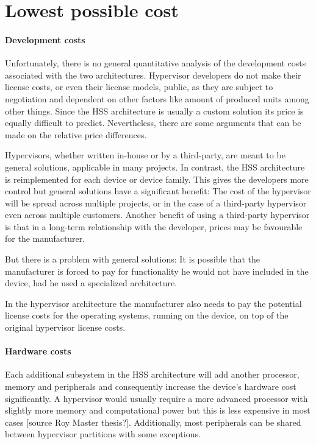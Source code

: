 
\section{Lowest possible cost}
\paragraph{Development costs}
Unfortunately, there is no general quantitative analysis of the development costs associated with the two architectures. Hypervisor developers do not make their license costs, or even their license models, public, as they are subject to negotiation and dependent on other factors like amount of produced units among other things. Since the \gls{HSS} architecture is usually a custom solution its price is equally difficult to predict. Nevertheless, there are some arguments that can be made on the relative price differences. 

Hypervisors, whether written in-house or by a third-party, are meant to be general solutions, applicable in many projects. In contrast, the \gls{HSS} architecture is reimplemented for each device or device family. This gives the developers more control but general solutions have a significant benefit: The cost of the hypervisor will be spread across multiple projects, or in the case of a third-party hypervisor even across multiple customers. Another benefit of using a third-party hypervisor is that in a long-term relationship with the developer, prices may be favourable for the manufacturer.

But there is a problem with general solutions: It is possible that the manufacturer is forced to pay for functionality he would not have included in the device, had he used a specialized architecture. 

In the hypervisor architecture the manufacturer also needs to pay the potential license costs for the operating systems, running on the device, on top of the original hypervisor license costs.

\paragraph{Hardware costs}
Each additional subsystem in the \gls{HSS} architecture will add another processor, memory and peripherals and consequently increase the device's hardware cost significantly. A hypervisor would usually require a more advanced processor with slightly more memory and computational power but this is less expensive in most cases [source Roy Master thesis?]. Additionally, most peripherals can be shared between hypervisor partitions with some exceptions.

